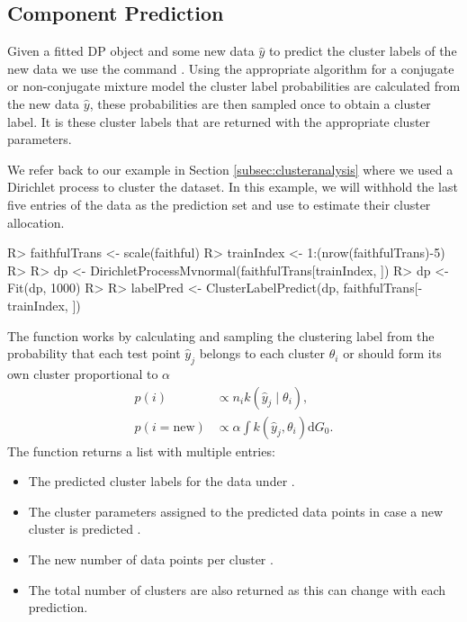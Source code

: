\documentclass[nojss]{jss}
\begin{document}
\subsection{Component Prediction}
Given a fitted DP object and some new data $\hat{y}$ to predict the cluster labels of the new data we use the command . Using the appropriate algorithm for a conjugate or non-conjugate mixture model the cluster label probabilities are calculated from the new data $\hat{y}$, these probabilities are then sampled once to obtain a cluster label. It is these cluster labels that are returned with the appropriate cluster parameters.

We refer back to our example in Section \ref{subsec:clusteranalysis} where we used a Dirichlet process to cluster the  dataset. In this example, we will withhold the last five entries of the data as the prediction set and use  to estimate their cluster allocation.

\begin{CodeInput}
R> faithfulTrans <- scale(faithful)
R> trainIndex <- 1:(nrow(faithfulTrans)-5)
R>
R> dp <- DirichletProcessMvnormal(faithfulTrans[trainIndex, ])
R> dp <- Fit(dp, 1000)
R>
R> labelPred <- ClusterLabelPredict(dp, faithfulTrans[-trainIndex, ])
\end{CodeInput}
The function  works by calculating and sampling the clustering label from the probability that each test point $\hat{y} _j$ belongs to each cluster $\theta _i$ or should form its own cluster proportional to $\alpha$
\begin{align*}
p(i) & \propto n_i k(\hat{y} _j \mid \theta _i), \\
p(i=\text{new}) & \propto \alpha \int k(\hat{y} _j , \theta _i) \mathrm{d} G_0.
\end{align*}
The function returns a list with multiple entries:
\begin{itemize}
\item The predicted cluster labels for the data under .
\item The cluster parameters assigned to the predicted data points in case a new cluster is predicted .
\item The new number of data points per cluster .
\item The total number of clusters are also returned  as this can change with each prediction.
\end{itemize}
\end{document}
